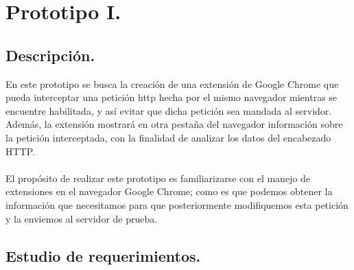 \documentclass[12pt, a4paper, titlepage]{report}
\begin{document}
		\section{Prototipo I.}
			\subsection{Descripción.}
				En este prototipo se busca la creación de una extensión de Google Chrome que pueda interceptar una petición \acrshort{http} hecha por el mismo navegador mientras se encuentre habilitada, y así evitar que dicha petición sea mandada al servidor. Además, la extensión mostrará en otra pestaña del navegador información sobre la petición interceptada, con la finalidad de analizar los datos del encabezado HTTP. \\\\
				El propósito de realizar este prototipo es familiarizarse con el manejo de extensiones en el navegador Google Chrome; como es que podemos obtener la información que necesitamos para que posteriormente modifiquemos esta petición y la enviemos al servidor de prueba. 
			
			
			
            
			\subsection{Estudio de requerimientos.}
\end{document}
